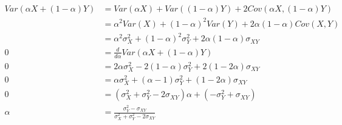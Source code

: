 \documentclass[10pt]{article}
\begin{document}
\begin{align*}Var(\alpha X+(1-\alpha)Y)
&=Var(\alpha X)+Var((1-\alpha)Y)+2 Cov(\alpha X, (1-\alpha)Y)\\
&=\alpha^2 Var(X) + (1-\alpha)^2Var(Y) + 2 \alpha (1-\alpha) Cov(X, Y) \\
&=\alpha^2 \sigma_X^2 + (1-\alpha)^2\sigma_Y^2 + 2 \alpha (1-\alpha) \sigma_{XY} \\
0 &= \frac{d}{d\alpha}Var(\alpha X+(1-\alpha)Y) \\
0 &=2\alpha \sigma_X^2 - 2(1-\alpha)\sigma_Y^2 +2(1-2\alpha)\sigma_{XY} \\
0 &=\alpha \sigma_X^2 + (\alpha -1)\sigma_Y^2 +(1-2\alpha)\sigma_{XY} \\
0 &= (\sigma_X^2 +\sigma_Y^2 -2\sigma_{XY})\alpha +(-\sigma_Y^2 +\sigma_{XY})\\
\alpha &= \frac{\sigma_Y^2 - \sigma_{XY}}{\sigma_X^2 +\sigma_Y^2 -2\sigma_{XY}}\end{align*}
\end{document}
